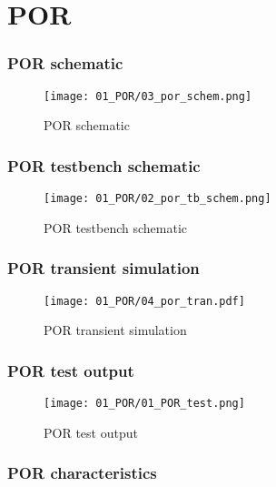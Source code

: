 \documentclass[xcolor=dvipsnames,envcountsect]{beamer}
\begin{document}
\section{POR}
\begin{frame}
	\frametitle{POR schematic}
	\begin{figure}[ht]
		\centering
		\texttt{[image: 01\_POR/03\_por\_schem.png]}
		\caption{POR schematic}
	\end{figure}
\end{frame}

\begin{frame}
	\frametitle{POR testbench schematic}
	\begin{figure}[ht]
		\centering
		\texttt{[image: 01\_POR/02\_por\_tb\_schem.png]}
		\caption{POR testbench schematic}
	\end{figure}
\end{frame}

\begin{frame}
	\frametitle{POR transient simulation}
	\begin{figure}[ht]
		\centering
		\texttt{[image: 01\_POR/04\_por\_tran.pdf]}
		\caption{POR transient simulation}
	\end{figure}
\end{frame}

\begin{frame}
	\frametitle{POR test output}
	\begin{figure}[ht]
		\centering
		\texttt{[image: 01\_POR/01\_POR\_test.png]}
		\caption{POR test output}
	\end{figure}
\end{frame}

\begin{frame}
	\frametitle{POR characteristics}
	\begin{figure}[ht]
		\centering
	\end{figure}
\end{frame}
\end{document}
